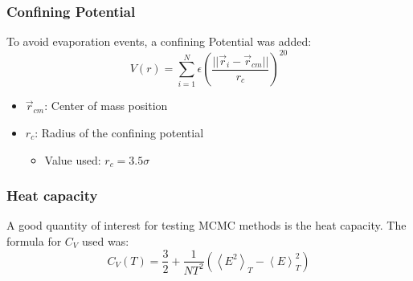\documentclass{beamer}
\begin{document}
	\begin{frame}
		\frametitle{Confining Potential}
		To avoid evaporation events, a confining Potential \cite{Nigra2005} was added:
		\begin{equation}
			V(r)=\sum_{i=1}^N\epsilon\left(\frac{||\vec{r}_i-\vec{r}_{cm}||}{r_c}\right)^{20}
		\end{equation}
		\begin{itemize}
			\item $\vec{r}_{cm}$: Center of mass position
			\item $r_c$: Radius of the confining potential
			\begin{itemize}
				\item Value used: $r_c=3.5\sigma$
			\end{itemize}
		\end{itemize}
	\end{frame}

	\begin{frame}
		\frametitle{Heat capacity}
		A good quantity of interest for testing MCMC methods is the heat capacity. The formula for $C_V$ used was:
		\begin{equation}
			C_V(T)=\frac{3}{2}+\frac{1}{NT^2}(\left<E^2\right>_T-\left<E\right>_T^2)
		\end{equation}

	\end{frame}
\end{document}
